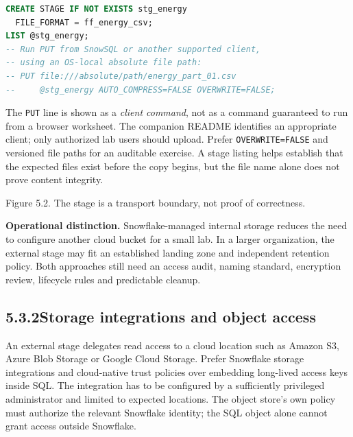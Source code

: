 \documentclass[11pt,twoside]{article}
\newcommand{\topic}[2]{\subsection*{#1\quad #2}}
\begin{document}
\begin{lstlisting}[language=SQL,caption={Create and inspect an internal ingestion stage.}]
CREATE STAGE IF NOT EXISTS stg_energy
  FILE_FORMAT = ff_energy_csv;
LIST @stg_energy;
-- Run PUT from SnowSQL or another supported client,
-- using an OS-local absolute file path:
-- PUT file:///absolute/path/energy_part_01.csv
--     @stg_energy AUTO_COMPRESS=FALSE OVERWRITE=FALSE;
\end{lstlisting}
The \texttt{PUT} line is shown as a \emph{client command}, not as a command guaranteed to run from a browser worksheet. The companion README identifies an appropriate client; only authorized lab users should upload. Prefer \texttt{OVERWRITE=FALSE} and versioned file paths for an auditable exercise. A stage listing helps establish that the expected files exist before the copy begins, but the file name alone does not prove content integrity.

\begin{center}\par{\fontsize{8}{10}\selectfont\color{inkgray}Figure 5.2. The stage is a transport boundary, not proof of correctness.}\end{center}
\textbf{Operational distinction.} Snowflake-managed internal storage reduces the need to configure another cloud bucket for a small lab. In a larger organization, the external stage may fit an established landing zone and independent retention policy. Both approaches still need an access audit, naming standard, encryption review, lifecycle rules and predictable cleanup.
\newpage
\topic{5.3.2}{Storage integrations and object access}
An external stage delegates read access to a cloud location such as Amazon S3, Azure Blob Storage or Google Cloud Storage. Prefer Snowflake storage integrations and cloud-native trust policies over embedding long-lived access keys inside SQL. The integration has to be configured by a sufficiently privileged administrator and limited to expected locations. The object store's own policy must authorize the relevant Snowflake identity; the SQL object alone cannot grant access outside Snowflake.
\end{document}
